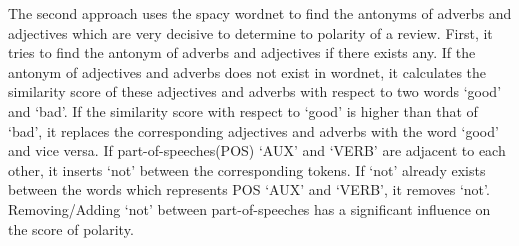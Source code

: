 \documentclass[11pt,a4paper]{article}
\begin{document}
The second approach uses the spacy wordnet to find the antonyms of adverbs and adjectives which are very decisive to determine to polarity of a review. First, it tries to find the antonym of adverbs and adjectives if there exists any. If the antonym of adjectives and adverbs does not exist in wordnet, it calculates the similarity score of these adjectives and adverbs with respect to two words ‘good’ and ‘bad’. If the similarity score with respect to ‘good’ is higher than that of ‘bad’, it replaces the corresponding adjectives and adverbs with the word ‘good’ and vice versa.
If part-of-speeches(POS) ‘AUX’ and ‘VERB’ are adjacent to each other, it inserts ‘not’ between the corresponding tokens. If ‘not’ already exists between the words which represents POS ‘AUX’ and ‘VERB’, it removes ‘not’. Removing/Adding ‘not’ between part-of-speeches has a significant influence on the score of polarity.\\
\end{document}

